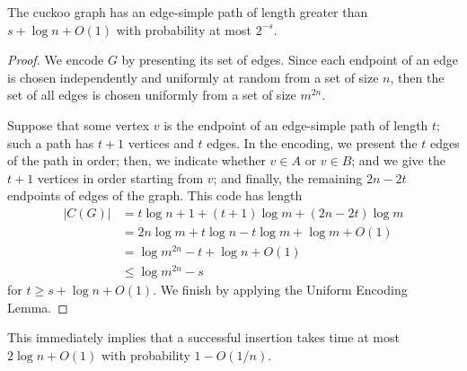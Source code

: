 \documentclass{patmorin}
\begin{document}
\begin{lem}
  The cuckoo graph has an edge-simple path of length greater than
  $s + \log n + O(1)$ with probability at most $2^{-s}$.
\end{lem}
\begin{proof}
  We encode $G$ by presenting its set of edges. Since each endpoint of
  an edge is chosen independently and uniformly at random from a set
  of size $n$, then the set of all edges is chosen uniformly from a
  set of size $m^{2n}$.

  Suppose that some vertex $v$ is the endpoint of an edge-simple path
  of length $t$; such a path has $t + 1$ vertices and $t$ edges. In
  the encoding, we present the $t$ edges of the path in order; then,
  we indicate whether $v \in A$ or $v \in B$; and we give the $t + 1$
  vertices in order starting from $v$; and finally, the remaining
  $2n - 2t$ endpoints of edges of the graph. This code has length
  \begin{align*}
    |C(G)| &= t \log n + 1 + (t + 1) \log m + (2n - 2t) \log m\\
           &= 2n \log m + t \log n - t \log m + \log m + O(1) \\
           &= \log m^{2n} - t + \log n + O(1) \\
           &\leq \log m^{2n} - s
  \end{align*}
  for $t \geq s + \log n + O(1)$. We finish by applying the Uniform
  Encoding Lemma.
\end{proof}
This immediately implies that a successful insertion takes time at
most $2 \log n + O(1)$ with probability $1 - O(1/n)$.
\end{document}
